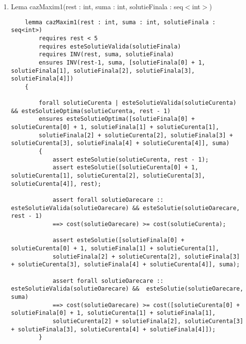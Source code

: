 \begin{enumerate}
\item Lema cazMaxim1(rest : int, suma : int, solutieFinala : seq$<$int$>$) 
\par
\begin{lstlisting}
	lemma cazMaxim1(rest : int, suma : int, solutieFinala : seq<int>)
		requires rest < 5
		requires esteSolutieValida(solutieFinala)
		requires INV(rest, suma, solutieFinala)
		ensures INV(rest-1, suma, [solutieFinala[0] + 1, solutieFinala[1], solutieFinala[2], solutieFinala[3], solutieFinala[4]])
	{
		
		forall solutieCurenta | esteSolutieValida(solutieCurenta) && esteSolutieOptima(solutieCurenta, rest - 1) 
		ensures esteSolutieOptima([solutieFinala[0] + solutieCurenta[0] + 1, solutieFinala[1] + solutieCurenta[1],
		solutieFinala[2] + solutieCurenta[2], solutieFinala[3] + solutieCurenta[3], solutieFinala[4] + solutieCurenta[4]], suma)
		{
			assert esteSolutie(solutieCurenta, rest - 1);
			assert esteSolutie([solutieCurenta[0] + 1, solutieCurenta[1], solutieCurenta[2], solutieCurenta[3], solutieCurenta[4]], rest);
			
			assert forall solutieOarecare :: esteSolutieValida(solutieOarecare) && esteSolutie(solutieOarecare, rest - 1) 
			==> cost(solutieOarecare) >= cost(solutieCurenta);
			
			assert esteSolutie([solutieFinala[0] + solutieCurenta[0] + 1, solutieFinala[1] + solutieCurenta[1],
			solutieFinala[2] + solutieCurenta[2], solutieFinala[3] + solutieCurenta[3], solutieFinala[4] + solutieCurenta[4]], suma);
			
			assert forall solutieOarecare :: esteSolutieValida(solutieOarecare) &&  esteSolutie(solutieOarecare, suma) 
			==> cost(solutieOarecare) >= cost([solutieCurenta[0] + solutieFinala[0] + 1, solutieCurenta[1] + solutieFinala[1],
			solutieCurenta[2] + solutieFinala[2], solutieCurenta[3] + solutieFinala[3], solutieCurenta[4] + solutieFinala[4]]);
		}
		

\end{lstlisting}
\end{enumerate}
